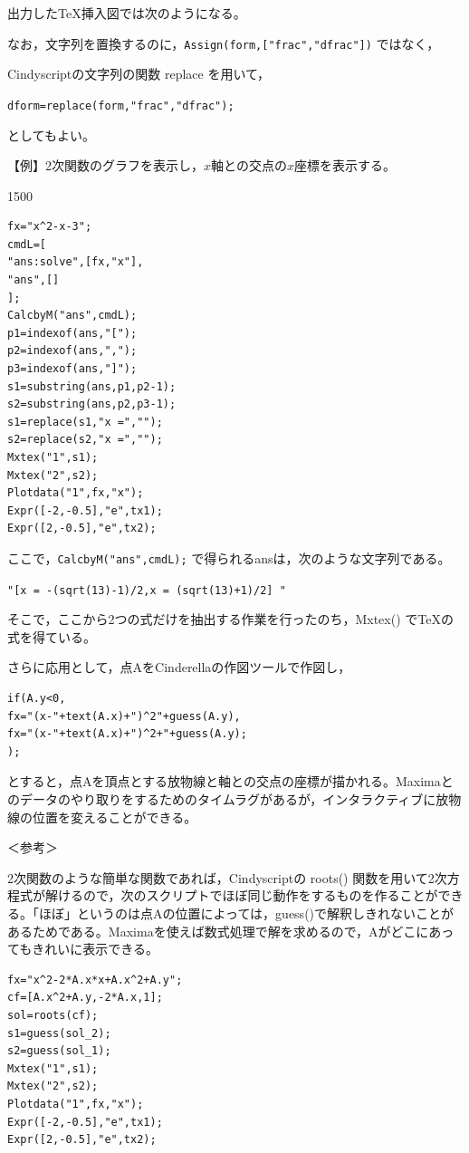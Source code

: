 \documentclass[papersize,a4paper,12pt,uplatex]{jsarticle}
\begin{document}
\begin{description}
\vspace{\baselineskip}
出力したTeX挿入図では次のようになる。

 

なお，文字列を置換するのに，\verb|Assign(form,["frac","dfrac"])| ではなく，

Cindyscriptの文字列の関数 replace を用いて，

\hspace{10mm} \verb|dform=replace(form,"frac","dfrac");| 

としてもよい。


\vspace{\baselineskip}
【例】2次関数のグラフを表示し，$x$軸との交点の$x$座標を表示する。

\begin{layer}{150}{0}
\end{layer}

\begin{verbatim}
fx="x^2-x-3";
cmdL=[
"ans:solve",[fx,"x"],
"ans",[]
];
CalcbyM("ans",cmdL);
p1=indexof(ans,"[");
p2=indexof(ans,",");
p3=indexof(ans,"]");
s1=substring(ans,p1,p2-1);
s2=substring(ans,p2,p3-1);
s1=replace(s1,"x =","");
s2=replace(s2,"x =","");
Mxtex("1",s1);
Mxtex("2",s2);
Plotdata("1",fx,"x");
Expr([-2,-0.5],"e",tx1);
Expr([2,-0.5],"e",tx2);
\end{verbatim}

ここで，\verb|CalcbyM("ans",cmdL);| で得られるansは，次のような文字列である。

\verb|"[x = -(sqrt(13)-1)/2,x = (sqrt(13)+1)/2] "|

そこで，ここから2つの式だけを抽出する作業を行ったのち，Mxtex() でTeXの式を得ている。

さらに応用として，点AをCinderellaの作図ツールで作図し，
\begin{verbatim}
if(A.y<0,
fx="(x-"+text(A.x)+")^2"+guess(A.y),
fx="(x-"+text(A.x)+")^2+"+guess(A.y);
);
\end{verbatim}
とすると，点Aを頂点とする放物線と軸との交点の座標が描かれる。Maximaとのデータのやり取りをするためのタイムラグがあるが，インタラクティブに放物線の位置を変えることができる。

\vspace{\baselineskip}
＜参考＞

2次関数のような簡単な関数であれば，Cindyscriptの roots() 関数を用いて2次方程式が解けるので，次のスクリプトでほぼ同じ動作をするものを作ることができる。「ほぼ」というのは点Aの位置によっては，guess()で解釈しきれないことがあるためである。Maximaを使えば数式処理で解を求めるので，Aがどこにあってもきれいに表示できる。
\begin{verbatim}
fx="x^2-2*A.x*x+A.x^2+A.y";
cf=[A.x^2+A.y,-2*A.x,1];
sol=roots(cf);
s1=guess(sol_2);
s2=guess(sol_1);
Mxtex("1",s1);
Mxtex("2",s2);
Plotdata("1",fx,"x");
Expr([-2,-0.5],"e",tx1);
Expr([2,-0.5],"e",tx2);
\end{verbatim}

\end{description}
\end{document}
